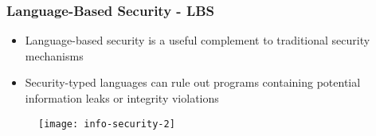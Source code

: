 \begin{frame}
\frametitle{Language-Based Security - LBS}
\begin{itemize}
	\item Language-based security is a useful complement to traditional security mechanisms
	\item Security-typed languages can rule out programs containing potential information leaks or integrity violations
\end{itemize}
\begin{figure}
\texttt{[image: info-security-2]}
\end{figure}
\end{frame}